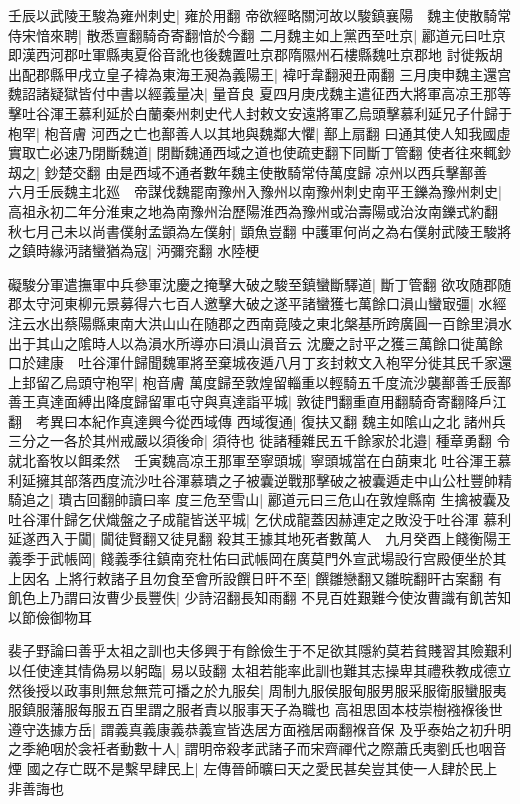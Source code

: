 壬辰以武陵王駿為雍州刺史|{
	雍於用翻}
帝欲經略關河故以駿鎮襄陽　魏主使散騎常侍宋愔來聘|{
	散悉亶翻騎奇寄翻愔於今翻}
二月魏主如上黨西至吐京|{
	酈道元曰吐京即漢西河郡吐軍縣夷夏俗音訛也後魏置吐京郡隋隰州石樓縣魏吐京郡地}
討徙叛胡出配郡縣甲戌立皇子褘為東海王昶為義陽王|{
	褘吁韋翻昶丑兩翻}
三月庚申魏主還宫　魏詔諸疑獄皆付中書以經義量决|{
	量音良}
夏四月庚戌魏主遣征西大將軍高凉王那等擊吐谷渾王慕利延於白蘭秦州刺史代人封敕文安遠將軍乙烏頭擊慕利延兄子什歸于枹罕|{
	枹音膚}
河西之亡也鄯善人以其地與魏鄰大懼|{
	鄯上扇翻}
曰通其使人知我國虛實取亡必速乃閉斷魏道|{
	閉斷魏通西域之道也使疏吏翻下同斷丁管翻}
使者往來輒鈔刼之|{
	鈔楚交翻}
由是西域不通者數年魏主使散騎常侍萬度歸凉州以西兵擊鄯善　六月壬辰魏主北廵　帝謀伐魏罷南豫州入豫州以南豫州刺史南平王鑠為豫州刺史|{
	高祖永初二年分淮東之地為南豫州治歷陽淮西為豫州或治壽陽或治汝南鑠式約翻}
秋七月己未以尚書僕射孟顗為左僕射|{
	顗魚豈翻}
中護軍何尚之為右僕射武陵王駿將之鎮時緣沔諸蠻猶為寇|{
	沔彌兖翻}
水陸梗

礙駿分軍遣撫軍中兵參軍沈慶之掩擊大破之駿至鎮蠻斷驛道|{
	斷丁管翻}
欲攻随郡随郡太守河東柳元景募得六七百人邀擊大破之遂平諸蠻獲七萬餘口溳山蠻㝡彊|{
	水經注云水出蔡陽縣東南大洪山山在随郡之西南竟陵之東北槃基所跨廣圓一百餘里溳水出于其山之隂時人以為溳水所導亦曰溳山溳音云}
沈慶之討平之獲三萬餘口徙萬餘口於建康　吐谷渾什歸聞魏軍將至棄城夜遁八月丁亥封敕文入枹罕分徙其民千家還上邽留乙烏頭守枹罕|{
	枹音膚}
萬度歸至敦煌留輜重以輕騎五千度流沙襲鄯善壬辰鄯善王真達面縛出降度歸留軍屯守與真達詣平城|{
	敦徒門翻重直用翻騎奇寄翻降戶江翻　考異曰本紀作真達興今從西域傳}
西域復通|{
	復扶又翻}
魏主如隂山之北諸州兵三分之一各於其州戒嚴以須後命|{
	須待也}
徙諸種雜民五千餘家於北邉|{
	種章勇翻}
令就北畜牧以餌柔然　壬寅魏高凉王那軍至寧頭城|{
	寧頭城當在白蓢東北}
吐谷渾王慕利延擁其部落西度流沙吐谷渾慕璝之子被囊逆戰那擊破之被囊遁走中山公杜豐帥精騎追之|{
	璝古回翻帥讀曰率}
度三危至雪山|{
	酈道元曰三危山在敦煌縣南}
生擒被囊及吐谷渾什歸乞伏熾盤之子成龍皆送平城|{
	乞伏成龍蓋因赫連定之敗没于吐谷渾}
慕利延遂西入于闐|{
	闐徒賢翻又徒見翻}
殺其王據其地死者數萬人　九月癸酉上餞衡陽王義季于武帳岡|{
	餞義季往鎮南兖杜佑曰武帳岡在廣莫門外宣武場設行宫殿便坐於其上因名}
上將行敕諸子且勿食至會所設饌日旰不至|{
	饌雛戀翻又雛晥翻旰古案翻}
有飢色上乃謂曰汝曹少長豐佚|{
	少詩沼翻長知雨翻}
不見百姓艱難今使汝曹識有飢苦知以節儉御物耳

裴子野論曰善乎太祖之訓也夫侈興于有餘儉生于不足欲其隱約莫若貧賤習其險艱利以任使達其情偽易以躬臨|{
	易以䜴翻}
太祖若能率此訓也難其志操卑其禮秩教成德立然後授以政事則無怠無荒可播之於九服矣|{
	周制九服侯服甸服男服采服衛服蠻服夷服鎮服藩服每服五百里謂之服者責以服事天子為職也}
高祖思固本枝崇樹襁褓後世遵守迭據方岳|{
	謂義真義康義恭義宣皆迭居方面襁居兩翻褓音保}
及乎泰始之初升明之季絶咽於衾衽者動數十人|{
	謂明帝殺孝武諸子而宋齊禪代之際蕭氏夷劉氏也咽音煙}
國之存亡既不是繫早肆民上|{
	左傳晉師曠曰天之愛民甚矣豈其使一人肆於民上}
非善誨也

